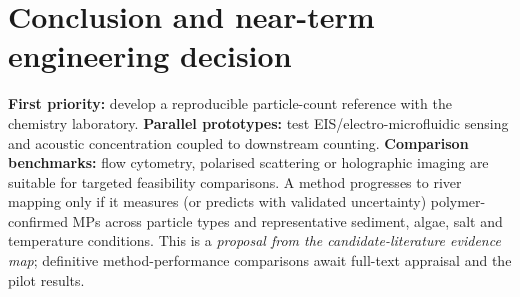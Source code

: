 \documentclass[10pt,a4paper]{article}
\begin{document}
\section{Conclusion and near-term engineering decision}
\textbf{First priority:} develop a reproducible particle-count reference with the chemistry laboratory. \textbf{Parallel prototypes:} test EIS/electro-microfluidic sensing and acoustic concentration coupled to downstream counting. \textbf{Comparison benchmarks:} flow cytometry, polarised scattering or holographic imaging are suitable for targeted feasibility comparisons. A method progresses to river mapping only if it measures (or predicts with validated uncertainty) polymer-confirmed MPs across particle types and representative sediment, algae, salt and temperature conditions. This is a \emph{proposal from the candidate-literature evidence map}; definitive method-performance comparisons await full-text appraisal and the pilot results.

\printbibliography[title={References}]
\end{document}
